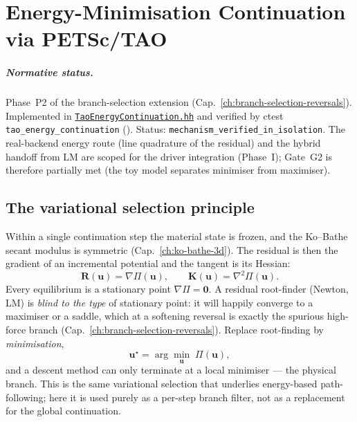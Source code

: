 
\chapter{Energy-Minimisation Continuation via PETSc/TAO}
\label{ch:energy-tao-continuation}

\paragraph{Normative status.}
Phase~P2 of the branch-selection extension
(Cap.~\ref{ch:branch-selection-reversals}). Implemented in
\href{run:src/analysis/TaoEnergyContinuation.hh}{%
\texttt{TaoEnergyContinuation.hh}} and verified by ctest
\texttt{tao\_energy\_continuation}
(). Status:
\texttt{mechanism\_verified\_in\_isolation}. The real-backend energy route
(line quadrature of the residual) and the hybrid handoff from LM are
scoped for the driver integration (Phase~I); Gate~G2 is therefore
partially met (the toy model separates minimiser from maximiser).

\section{The variational selection principle}

Within a single continuation step the material state is frozen, and the
Ko--Bathe secant modulus is symmetric
(Cap.~\ref{ch:ko-bathe-3d}). The residual is then the gradient of
an incremental potential and the tangent is its Hessian:
\[
  \mathbf{R}(\mathbf{u})=\nabla\Pi(\mathbf{u}),
  \qquad
  \mathbf{K}(\mathbf{u})=\nabla^2\Pi(\mathbf{u}).
\]
Every equilibrium is a stationary point \(\nabla\Pi=\mathbf{0}\). A
residual root-finder (Newton, LM) is \emph{blind to the type} of
stationary point: it will happily converge to a maximiser or a saddle,
which at a softening reversal is exactly the spurious high-force branch
(Cap.~\ref{ch:branch-selection-reversals}). Replace root-finding by
\emph{minimisation},
\[
  \mathbf{u}^\star=\arg\min_{\mathbf{u}}\;\Pi(\mathbf{u}),
\]
and a descent method can only terminate at a local minimiser --- the
physical branch. This is the same variational selection that underlies
energy-based path-following; here it is used purely as a per-step branch
filter, not as a replacement for the global continuation.

